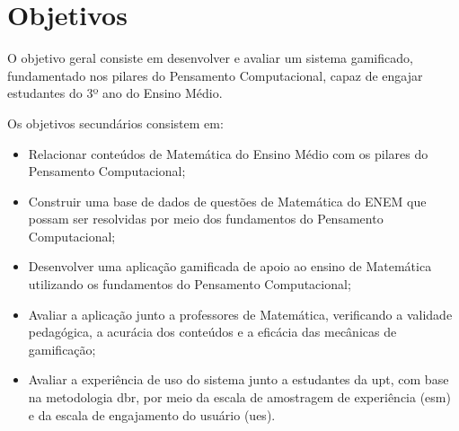 
\chapter{Objetivos}
\label{ch:objetivos}

O objetivo geral consiste em desenvolver e avaliar um sistema gamificado, fundamentado nos pilares do Pensamento Computacional, capaz de engajar estudantes do 3º ano do Ensino Médio.

Os objetivos secundários consistem em:
\begin{itemize}
    \item Relacionar conteúdos de Matemática do Ensino Médio com os pilares do Pensamento Computacional;
    \item Construir uma base de dados de questões de Matemática do ENEM que possam ser resolvidas por meio dos fundamentos do Pensamento Computacional;
    \item Desenvolver uma aplicação gamificada de apoio ao ensino de Matemática utilizando os fundamentos do Pensamento Computacional;
    \item Avaliar a aplicação junto a professores de Matemática, verificando a validade pedagógica, a acurácia dos conteúdos e a eficácia das mecânicas de gamificação;
    \item Avaliar a experiência de uso do sistema junto a estudantes da \gls{upt}, com base na metodologia \gls{dbr}, por meio da escala de amostragem de experiência (\gls{esm}) e da escala de engajamento do usuário (\gls{ues}).
\end{itemize} 


